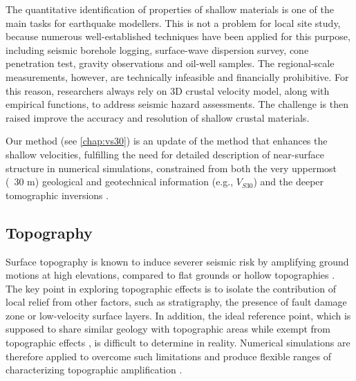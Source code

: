 The quantitative identification of properties of shallow materials is one of the main tasks for earthquake modellers. This is not a problem for local site study, because numerous well-established techniques have been applied for this purpose, including seismic borehole logging, surface-wave dispersion survey, cone penetration test, gravity observations and oil-well samples. The regional-scale measurements, however, are technically infeasible and financially prohibitive. For this reason, researchers always rely on 3D crustal velocity model, along with empirical functions, to address seismic hazard assessments. The challenge is then raised improve the accuracy and resolution of shallow crustal materials.

Our method (see \cref{chap:vs30}) is an update of the \citet{elyVs30derivedNearsurfaceSeismic2010} method that enhances the shallow velocities, fulfilling the need for detailed description of near-surface structure in numerical simulations, constrained from both the very uppermost (~30 m) geological and geotechnical information (e.g., $V_{S30}$) and the deeper tomographic inversions .



\subsection{Topography}
Surface topography is known to induce severer seismic risk by amplifying ground motions at high elevations, compared to flat grounds or hollow topographies \citep{celebiTopographicalGeologicalAmplifications1987,kawaseTopographyEffectCritical1990,massaExperimentalApproachEstimating2010,burjanekEmpiricalEvidenceLocal2014}. The key point in exploring topographic effects is to isolate the contribution of local relief from other factors, such as stratigraphy, the presence of fault damage zone or low-velocity surface layers. In addition, the ideal reference point, which is supposed to share similar geology with topographic areas while exempt from topographic effects \citep{celebiTopographicalGeologicalAmplifications1987,geliEffectTopographyEarthquake1988,chavez-garciaComplexSiteEffects2000}, is difficult to determine in reality. Numerical simulations are therefore applied to overcome such limitations and produce flexible ranges of characterizing topographic ampliﬁcation \citep{booreNoteEffectSimple1972,sanchez-sesmaDiffractionSVRayleigh1991,lovati2011estimation,hartzellGroundMotionPresence2017}.

